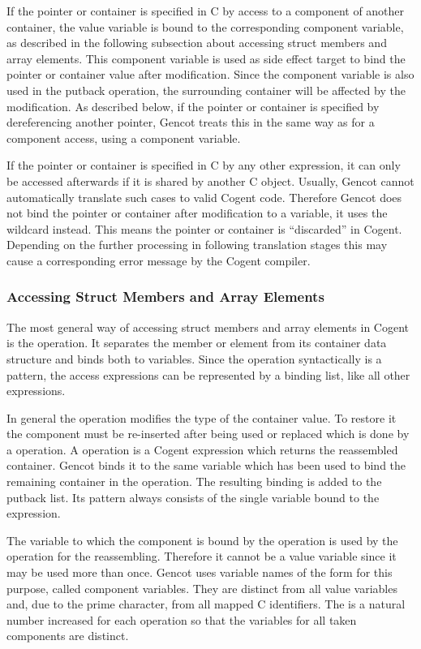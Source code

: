 If the pointer or container is specified in C by access to a component of another container, the value variable 
 is bound to the corresponding component variable, as described in the following subsection about 
accessing struct members and array elements. This component variable is used as side effect target to bind the pointer
or container value after modification. Since the component variable is also used in the putback operation, the surrounding
container will be affected by the modification. As described below, if the pointer or container is specified by dereferencing
another pointer, Gencot treats this in the same way as for a component access, using a component variable.

If the pointer or container is specified in C by any other expression, it can only be accessed afterwards if it is shared 
by another C object. Usually, Gencot cannot automatically translate such cases to valid Cogent code. Therefore Gencot 
does not bind the pointer or container after modification to a variable, it uses the wildcard \code{\_} instead. This
means the pointer or container is ``discarded'' in Cogent. Depending on the further processing in following translation 
stages this may cause a corresponding error message by the Cogent compiler.

\subsubsection{Accessing Struct Members and Array Elements}

The most general way of accessing struct members and array elements in Cogent is the  operation. It separates
the member or element from its container data structure and binds both to variables. Since the  operation 
syntactically is a pattern, the access expressions can be represented by a binding list, like all other expressions.

In general the  operation modifies the type of the container value. To restore it the component must 
be re-inserted after being used or replaced which is done by a  operation. A  operation is a Cogent
expression which returns the reassembled container. Gencot binds it to the same variable which has been used 
to bind the remaining container in the  operation. The resulting binding is added to the putback list.
Its pattern always consists of the single variable bound to the  expression.

The variable to which the component is bound by the  operation is used by the  operation for the 
reassembling. Therefore it cannot be a value variable since it may be used more than once. Gencot uses variable names 
of the form  for this purpose, called component variables. They are distinct from all value variables and, 
due to the prime character, from all mapped C identifiers. The  is a natural number increased for each 
operation so that the variables for all taken components are distinct.

